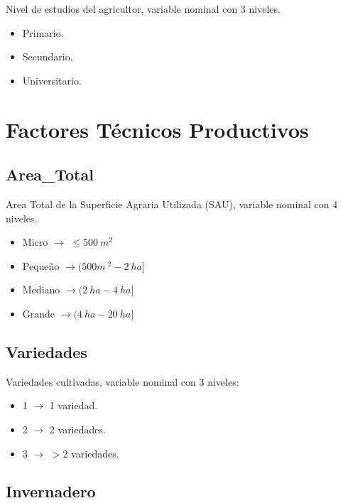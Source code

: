 \documentclass[a4paper, nobind]{templates/ociamthesis}
\providecommand{\tightlist}{%
  \setlength{\itemsep}{0pt}\setlength{\parskip}{0pt}}
\begin{document}
Nivel de estudios del agricultor, variable nominal con 3 niveles.

\begin{itemize}
\tightlist
\item
  Primario.
\item
  Secundario.
\item
  Universitario.
\end{itemize}

\hypertarget{factores-tuxe9cnicos-productivos}{%
\section{Factores Técnicos Productivos}\label{factores-tuxe9cnicos-productivos}}

\hypertarget{area_total}{%
\subsection{Area\_Total}\label{area_total}}

Area Total de la Superficie Agraria Utilizada (SAU), variable nominal con 4 niveles.

\begin{itemize}
\tightlist
\item
  Micro \(\rightarrow\) \(\leq 500\ m^2\)
\item
  Pequeño \(\rightarrow (500m\ ^2 - 2\ ha]\)
\item
  Mediano \(\rightarrow (2\ ha - 4\ ha]\)
\item
  Grande \(\rightarrow (4\ ha -20\ ha]\)
\end{itemize}

\hypertarget{variedades}{%
\subsection{Variedades}\label{variedades}}

Variedades cultivadas, variable nominal con 3 niveles:

\begin{itemize}
\item
  1 \(\rightarrow\) 1 variedad.
\item
  2 \(\rightarrow\) 2 variedades.
\item
  3 \(\rightarrow\) \(>2\) variedades.
\end{itemize}

\hypertarget{invernadero}{%
\subsection{Invernadero}\label{invernadero}}
\end{document}
